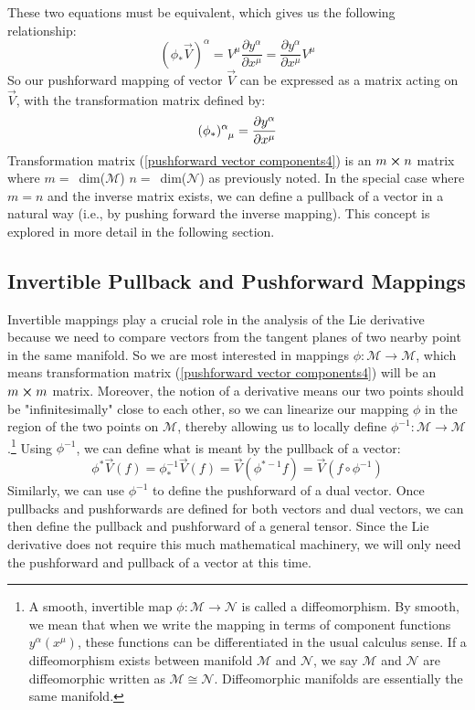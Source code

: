 \documentclass[10pt]{article}
\begin{document}
These two equations must be equivalent, which gives us the following relationship:
\begin{equation}
\label{pushforward vector components3}
    (\phi_\ast \vec V)^\alpha = V^\mu  \frac{\partial y^\alpha}{\partial x^\mu} = \frac{\partial y^\alpha}{\partial x^\mu}  V^\mu
\end{equation}
So our pushforward mapping of vector $\vec V$ can be expressed as a matrix acting on $\vec V$, with the transformation matrix defined by:
\begin{equation}
\label{pushforward vector components4}
    \tensor{(\phi_\ast)}{^\alpha_\mu} = \frac{\partial y^\alpha}{\partial x^\mu}
\end{equation}
Transformation matrix  (\ref {pushforward vector components4}) is an $m \cross n$ matrix where $m=$\ dim($\mathcal{M}$) $n= $\ dim($\mathcal{N}$) as previously noted. In the special case where $m=n$ and the inverse matrix exists, we can define a pullback of a vector in a natural way (i.e., by pushing forward the inverse mapping). This concept is explored in more detail in the following section.

\newpage
     \subsection{Invertible Pullback and Pushforward Mappings}
Invertible mappings play a crucial role in the analysis of the Lie derivative because we need to compare vectors from the tangent planes of two nearby point in the same manifold. So we are most interested in mappings $\phi : \mathcal{M} \longrightarrow \mathcal{M}$, which means transformation matrix (\ref {pushforward vector components4}) will be an $m \cross m$ matrix.  Moreover, the notion of a derivative means our two points should be "infinitesimally" close to each other, so we can linearize our mapping $\phi$ in the region of the two points on $\mathcal{M}$, thereby allowing us to locally define $\phi^{-1} : \mathcal{M} \longrightarrow \mathcal{M}$.\footnote{A smooth, invertible map $\phi : \mathcal{M} \longrightarrow \mathcal{N}$ is called a diffeomorphism.  By smooth, we mean that when we write the mapping in terms of component functions $y^\alpha (x^\mu)$, these functions can be differentiated in the usual calculus sense. If a diffeomorphism exists between manifold $\mathcal{M}$ and $\mathcal{N}$, we say $\mathcal{M}$ and $\mathcal{N}$ are diffeomorphic written as $\mathcal{M} \cong \mathcal{N}$.  Diffeomorphic manifolds are essentially the same manifold.} Using $\phi^{-1}$, we can define what is meant by the pullback of a vector:
\begin{equation}
\label{pullback vector equation}
   \phi^\ast \vec V (f)= \phi_\ast^{-1} \vec V (f) = \vec V (\phi^{\ast -1} f)=\vec V(f \circ \phi^{-1})
\end{equation}
Similarly, we can use $\phi^{-1}$ to define the pushforward of a dual vector. Once pullbacks and pushforwards are defined for both vectors and dual vectors, we can then define the pullback and pushforward of a general tensor. Since the Lie derivative does not require this much mathematical machinery, we will only need the pushforward and pullback of a vector at this time.
\end{document}
